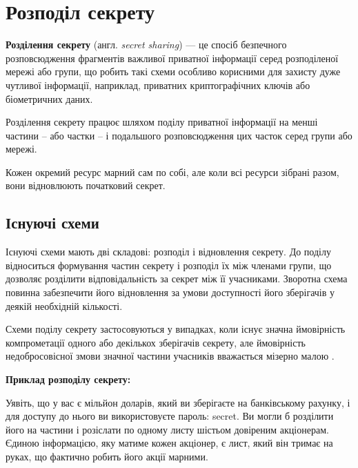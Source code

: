 
\chapter{Розподіл секрету}
\label{chap:review1}  %

\textbf{Розділення секрету} (англ. \textit{secret sharing}) \cite{keylessSS} --- це спосіб безпечного розповсюдження фрагментів важливої приватної інформації серед розподіленої мережі або групи, що робить такі схеми особливо корисними для захисту дуже чутливої інформації, наприклад, приватних криптографічних ключів або біометричних даних.

Розділення секрету працює шляхом поділу приватної інформації на менші частини -- або частки -- і подальшого розповсюдження цих часток серед групи або мережі.

Кожен окремий ресурс марний сам по собі, але коли всі ресурси зібрані разом, вони відновлюють початковий секрет.

\section{Існуючі схеми}
Існуючі схеми мають дві складові: розподіл і відновлення секрету. До поділу відноситься формування частин секрету і розподіл їх між членами групи, що дозволяє розділити відповідальність за секрет між її учасниками. Зворотна схема повинна забезпечити його відновлення за умови доступності його зберігачів у деякій необхідній кількості.

Схеми поділу секрету застосовуються у випадках, коли існує значна ймовірність компрометації одного або декількох зберігачів секрету, але ймовірність недобросовісної змови значної частини учасників вважається мізерно малою \cite{wikipedia}.

\vspace{0.25cm}
\textbf{Приклад розподілу секрету:} \par
Уявіть, що у вас є мільйон доларів, який ви зберігаєте на банківському рахунку, і для доступу до нього ви використовуєте пароль: secret. Ви могли б розділити його на частини і розіслати по одному листу шістьом довіреним акціонерам. Єдиною інформацією, яку матиме кожен акціонер, є лист, який він тримає на руках, що фактично робить його акції марними.

